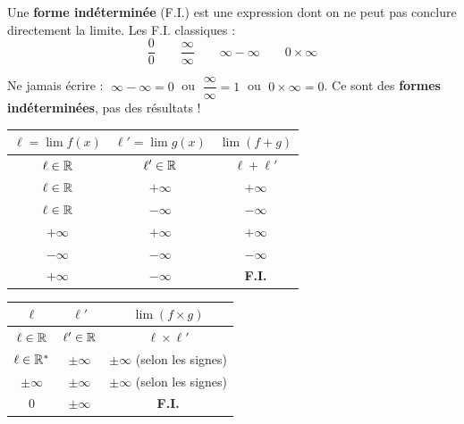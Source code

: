 \begin{definition}
  Une \textbf{forme ind\'{e}termin\'{e}e} (F.I.) est une expression dont on
  ne peut pas conclure directement la limite. Les F.I. classiques :
  \[
    \frac{0}{0} \qquad \frac{\infty}{\infty} \qquad
    \infty - \infty \qquad 0 \times \infty
  \]
\end{definition}

\begin{attention}
  Ne jamais \'{e}crire :
  $\;\infty - \infty = 0\;$ ou $\;\dfrac{\infty}{\infty} = 1\;$
  ou $\;0 \times \infty = 0$.
  Ce sont des \textbf{formes ind\'{e}termin\'{e}es}, pas des r\'{e}sultats !
\end{attention}

\begin{theoreme}
  \bigskip
  \begin{center}
  \renewcommand{\arraystretch}{1.6}
  \begin{tabular}{|c|c|c|}
    \hline
    \textbf{\color{navy}$\ell = \lim f(x)$}
      & \textbf{\color{navy}$\ell' = \lim g(x)$}
      & \textbf{\color{navy}$\lim(f+g)$} \\
    \hline\hline
    $\ell \in \mathbb{R}$ & $\ell' \in \mathbb{R}$ & $\ell + \ell'$ \\
    \hline
    $\ell \in \mathbb{R}$ & $+\infty$ & $+\infty$ \\
    \hline
    $\ell \in \mathbb{R}$ & $-\infty$ & $-\infty$ \\
    \hline
    $+\infty$ & $+\infty$ & $+\infty$ \\
    \hline
    $-\infty$ & $-\infty$ & $-\infty$ \\
    \hline
    $+\infty$ & $-\infty$ & \textbf{F.I.} \\
    \hline
  \end{tabular}
  \end{center}
\end{theoreme}

\begin{theoreme}
  \bigskip
  \begin{center}
  \renewcommand{\arraystretch}{1.6}
  \begin{tabular}{|c|c|c|}
    \hline
    \textbf{\color{navy}$\ell$}
      & \textbf{\color{navy}$\ell'$}
      & \textbf{\color{navy}$\lim(f \times g)$} \\
    \hline\hline
    $\ell \in \mathbb{R}$ & $\ell' \in \mathbb{R}$ & $\ell \times \ell'$ \\
    \hline
    $\ell \in \mathbb{R}^*$ & $\pm\infty$ & $\pm\infty$ (selon les signes) \\
    \hline
    $\pm\infty$ & $\pm\infty$ & $\pm\infty$ (selon les signes) \\
    \hline
    $0$ & $\pm\infty$ & \textbf{F.I.} \\
    \hline
  \end{tabular}
  \end{center}
\end{theoreme}

